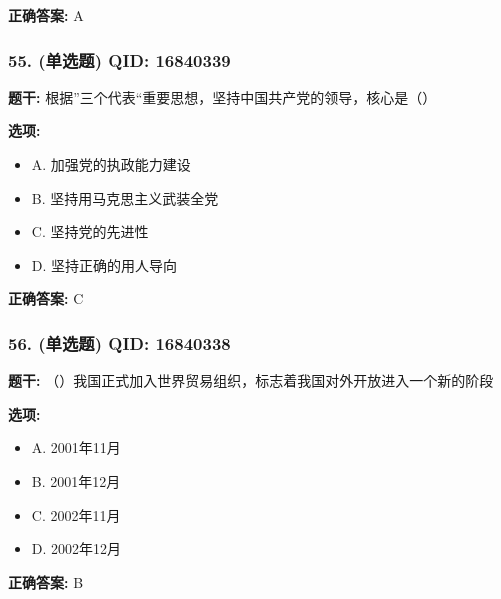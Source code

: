 \documentclass[12pt,UTF8]{ctexart}
\begin{document}
\textbf{正确答案:}
A

\vspace{0.3em}\hrulefill\vspace{0.7em}

\subsubsection*{55. (单选题) \small QID: 16840339}

\textbf{题干:}
根据”三个代表“重要思想，坚持中国共产党的领导，核心是（）

\textbf{选项:}
\begin{itemize}[leftmargin=*]

  \item A. 加强党的执政能力建设

  \item B. 坚持用马克思主义武装全党

  \item C. 坚持党的先进性

  \item D. 坚持正确的用人导向

\end{itemize}

\textbf{正确答案:}
C

\vspace{0.3em}\hrulefill\vspace{0.7em}

\subsubsection*{56. (单选题) \small QID: 16840338}

\textbf{题干:}
（）我国正式加入世界贸易组织，标志着我国对外开放进入一个新的阶段

\textbf{选项:}
\begin{itemize}[leftmargin=*]

  \item A. 2001年11月

  \item B. 2001年12月

  \item C. 2002年11月

  \item D. 2002年12月

\end{itemize}

\textbf{正确答案:}
B

\vspace{0.3em}\hrulefill\vspace{0.7em}
\end{document}
